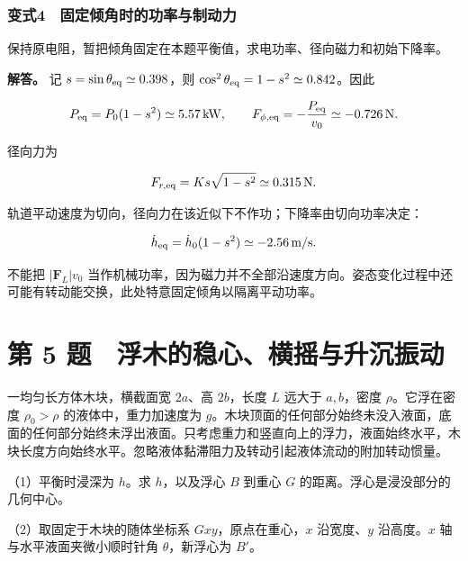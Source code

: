 \documentclass[12pt,a4paper,fontset=fandol]{ctexart}
\begin{document}
\par\noindent\begin{minipage}{\linewidth}
\setlength{\parindent}{2em}\setlength{\parskip}{.35em}
\subsubsection{变式4　固定倾角时的功率与制动力}\label{ux53d8ux5f0f4-ux56faux5b9aux503eux89d2ux65f6ux7684ux529fux7387ux4e0eux5236ux52a8ux529b}

保持原电阻，暂把倾角固定在本题平衡值，求电功率、径向磁力和初始下降率。

\textbf{解答。} 记 \(s=\sin\theta_{\rm eq}\simeq0.398\)，则
\(\cos^2\theta_{\rm eq}=1-s^2\simeq0.842\)。因此

\[
P_{\rm eq}=P_0(1-s^2)\simeq5.57\,\mathrm{kW},
\qquad
F_{\phi,\rm eq}=-\frac{P_{\rm eq}}{v_0}\simeq-0.726\,\mathrm N.
\]

径向力为

\[
F_{r,\rm eq}=K s\sqrt{1-s^2}\simeq0.315\,\mathrm N.
\]

轨道平动速度为切向，径向力在该近似下不作功；下降率由切向功率决定：

\[
\dot h_{\rm eq}=\dot h_0(1-s^2)\simeq-2.56\,\mathrm{m/s}.
\]

不能把 \(|\boldsymbol F_L|v_0\)
当作机械功率，因为磁力并不全部沿速度方向。姿态变化过程中还可能有转动能交换，此处特意固定倾角以隔离平动功率。


\end{minipage}\par
\clearpage

\section{第 5
题　浮木的稳心、横摇与升沉振动}\label{ux7b2c-5-ux9898-ux6d6eux6728ux7684ux7a33ux5fc3ux6a2aux6447ux4e0eux5347ux6c89ux632fux52a8}

一均匀长方体木块，横截面宽 \(2a\)、高 \(2b\)，长度 \(L\) 远大于
\(a,b\)，密度 \(\rho\)。它浮在密度 \(\rho_0>\rho\)
的液体中，重力加速度为
\(g\)。木块顶面的任何部分始终未没入液面，底面的任何部分始终未浮出液面。只考虑重力和竖直向上的浮力，液面始终水平，木块长度方向始终水平。忽略液体黏滞阻力及转动引起液体流动的附加转动惯量。

（1）平衡时浸深为 \(h\)。求 \(h\)，以及浮心 \(B\) 到重心 \(G\)
的距离。浮心是浸没部分的几何中心。

（2）取固定于木块的随体坐标系 \(Gxy\)，原点在重心，\(x\) 沿宽度、\(y\)
沿高度。\(x\) 轴与水平液面夹微小顺时针角 \(\theta\)，新浮心为 \(B'\)。
\end{document}
